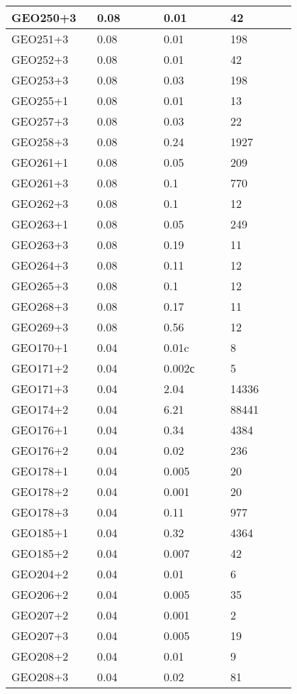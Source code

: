 \begin{longtable}[H]{|p{0.2\linewidth}|p{0.2\linewidth}|p{0.2\linewidth}|p{0.2\linewidth}|}
\hline
GEO250+3 & 0.08 & 0.01 & 42 \\
\hline
GEO251+3 & 0.08 & 0.01 & 198 \\
\hline
GEO252+3 & 0.08 & 0.01 & 42 \\
\hline
GEO253+3 & 0.08 & 0.03 & 198 \\
\hline
GEO255+1 & 0.08 & 0.01 & 13 \\
\hline
GEO257+3 & 0.08 & 0.03 &  22 \\
\hline
GEO258+3 & 0.08 & 0.24 &  1927 \\
\hline
GEO261+1 & 0.08 & 0.05 &  209 \\
\hline
GEO261+3 & 0.08 &  0.1 &  770 \\
\hline
GEO262+3 & 0.08 &  0.1 & 12 \\
\hline
GEO263+1 & 0.08 & 0.05 &  249 \\
\hline
GEO263+3 & 0.08 & 0.19 &  11 \\
\hline
GEO264+3 & 0.08 & 0.11 &  12 \\
\hline
GEO265+3 & 0.08 &  0.1 &  12 \\
\hline
GEO268+3 & 0.08 & 0.17 &  11 \\
\hline
GEO269+3 & 0.08 & 0.56 & 12 \\
\hline
GEO170+1 &  0.04 &  0.01c &  8 \\
\hline
GEO171+2 &  0.04 &  0.002с &  5 \\
\hline
GEO171+3 &  0.04 &  2.04 &  14336 \\
\hline
GEO174+2 &  0.04 &  6.21 &  88441 \\
\hline
GEO176+1 &  0.04 &  0.34 &  4384 \\
\hline
GEO176+2 &  0.04 &  0.02 &  236 \\
\hline
GEO178+1 &  0.04 &  0.005 &  20 \\
\hline
GEO178+2 &  0.04 &  0.001 &  20 \\
\hline
GEO178+3 &  0.04 &  0.11 &  977 \\
\hline
GEO185+1 &  0.04 &  0.32 &  4364 \\
\hline
GEO185+2 &  0.04 &  0.007 &  42 \\
\hline
GEO204+2 &  0.04 &  0.01 &  6 \\
\hline
GEO206+2 &  0.04 &  0.005 &  35 \\
\hline
GEO207+2 &  0.04 &  0.001 &  2 \\
\hline
GEO207+3 &  0.04 &  0.005 &  19 \\
\hline
GEO208+2 &  0.04 &  0.01 &  9 \\
\hline
GEO208+3 &  0.04 &  0.02 &  81 \\

\end{longtable}
